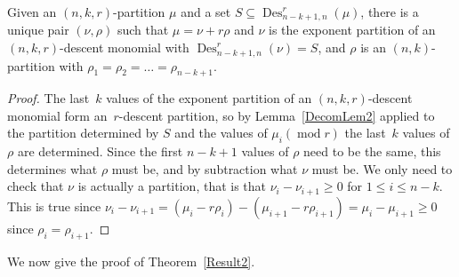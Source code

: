 \documentclass[10pt]{article}
\newcommand{\modrm}{\operatorname{mod}}\newcommand{\Des}{\operatorname{Des}}\newcommand{\des}{\operatorname{des}}
\begin{document}
\begin{lemm}

\label{Decom2Lem2}

Given an $(n,k,r)$-partition $\mu$ and a set $S\subseteq \Des ^r_{n-k+1,n}(\mu)$, there is a unique pair $(\nu,\rho)$ such that 
$\mu=\nu+r\rho$ and $\nu$ is the exponent partition of an $(n,k,r)$-descent monomial with $\Des ^r_{n-k+1,n}(\nu)=S$, and $\rho$ 
is an $(n,k)$-partition with $\rho_1=\rho_2=\ldots =\rho_{n-k+1}$.

	\begin{proof}

		The last~$k$ values of the exponent partition of an $(n,k,r)$-descent monomial form an~$r$-descent partition, so by 
Lemma~\ref{DecomLem2} applied to the partition determined by $S$ and the values of $\mu_i (\modrm r)$ the last~$k$ values of $\rho$ are determined. Since the first $n-k+1$ values of $\rho$ need to be the same, this determines 
what $\rho$ must be, and by subtraction what $\nu$ must be. We only need to check that $\nu$ is actually a partition, 
that is that $\nu_i-\nu_{i+1}\geq 0$ for $1\leq i\leq n-k$. This is true since 
$\nu_i-\nu_{i+1}=(\mu_{i}-r\rho_i)-(\mu_{i+1}-r\rho_{i+1})=\mu_i-\mu_{i+1}\geq 0$ since $\rho_i=\rho_{i+1}$.
	\end{proof}

\end{lemm}

We now give the proof of Theorem~\ref{Result2}.
\end{document}

